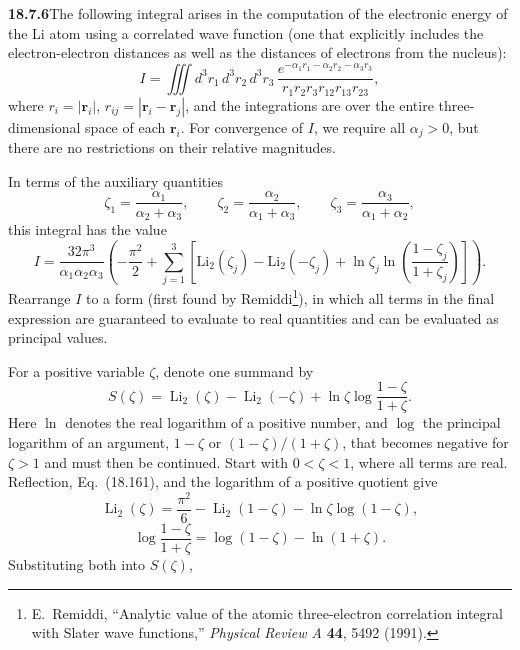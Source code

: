 \par\bigskip
\noindent\textbf{18.7.6}\quad The following integral arises in the
computation of the electronic energy of the Li atom using a
correlated wave function (one that explicitly includes the
electron-electron distances as well as the distances of electrons
from the nucleus):
\[
I=\iiint d^{3}r_{1}\,d^{3}r_{2}\,d^{3}r_{3}\,
\frac{e^{-\alpha_{1}r_{1}-\alpha_{2}r_{2}-\alpha_{3}r_{3}}}
{r_{1}r_{2}r_{3}r_{12}r_{13}r_{23}},
\]
where $r_{i}=|\mathbf{r}_{i}|$,
$r_{ij}=|\mathbf{r}_{i}-\mathbf{r}_{j}|$, and the integrations are
over the entire three-dimensional space of each $\mathbf{r}_{i}$.
For convergence of $I$, we require all $\alpha_{j}>0$, but there
are no restrictions on their relative magnitudes.
\par In terms of the auxiliary quantities
\[
\zeta_{1}=\frac{\alpha_{1}}{\alpha_{2}+\alpha_{3}},\qquad
\zeta_{2}=\frac{\alpha_{2}}{\alpha_{1}+\alpha_{3}},\qquad
\zeta_{3}=\frac{\alpha_{3}}{\alpha_{1}+\alpha_{2}},
\]
this integral has the value
\[
I=\frac{32\pi^{3}}{\alpha_{1}\alpha_{2}\alpha_{3}}
\left(-\frac{\pi^{2}}{2}+\sum_{j=1}^{3}
\left[\mathrm{Li}_{2}(\zeta_{j})-\mathrm{Li}_{2}(-\zeta_{j})
+\ln\zeta_{j}\ln\left(\frac{1-\zeta_{j}}{1+\zeta_{j}}\right)\right]\right).
\]
Rearrange $I$ to a form (first found by Remiddi\footnote{E.~Remiddi, ``Analytic value of the atomic three-electron correlation integral with Slater wave functions,'' \emph{Physical Review A} \textbf{44}, 5492 (1991).}), in which
all terms in the final expression are guaranteed to evaluate to
real quantities and can be evaluated as principal values.
\par\nobreak
\solution
For a positive variable $\zeta$, denote one summand by
\[
S(\zeta)=\operatorname{Li}_2(\zeta)-\operatorname{Li}_2(-\zeta)
 +\ln\zeta\log\frac{1-\zeta}{1+\zeta}.
\]
Here $\ln$ denotes the real logarithm of a positive number, and
$\log$ the principal logarithm of an argument, $1-\zeta$ or
$(1-\zeta)/(1+\zeta)$, that becomes negative for $\zeta>1$ and must
then be continued.
Start with $0<\zeta<1$, where all terms are real.  Reflection,
Eq.~(18.161), and the logarithm of a positive quotient give
\[
\operatorname{Li}_2(\zeta)=\frac{\pi^2}{6}
 -\operatorname{Li}_2(1-\zeta)-\ln\zeta\log(1-\zeta),
\]
\[
\log\frac{1-\zeta}{1+\zeta}
 =\log(1-\zeta)-\ln(1+\zeta).
\]
Substituting both into $S(\zeta)$,
